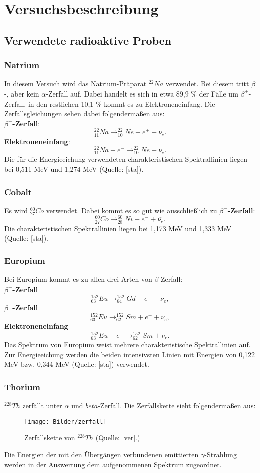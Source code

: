 \clearpage
\section{Versuchsbeschreibung}
\subsection{Verwendete radioaktive Proben}
\subsubsection{Natrium}
In diesem Versuch wird das Natrium-Präparat $^{22}Na$ verwendet. Bei diesem tritt $\beta$-, aber kein $\alpha$-Zerfall auf. Dabei handelt es sich in etwa 89,9 \% der Fälle um $\beta^{+}$-Zerfall, in den restlichen 10,1 \% kommt es zu Elektroneneinfang. Die Zerfallsgleichungen sehen dabei folgendermaßen aus:\\
\textbf{$\beta^{+}$-Zerfall}: \[^{22}_{11}Na\rightarrow ^{22}_{10}Ne+e^{+}+\nu_{e}.\]
\textbf{Elektroneneinfang}:
\[^{22}_{11}Na+e^{-}\rightarrow ^{22}_{10}Ne+\nu_{e}.\]
Die für die Energieeichung verwendeten charakteristischen Spektrallinien liegen bei 0,511 MeV und 1,274 MeV (Quelle: [sta]).
\subsubsection{Cobalt}
Es wird $^{60}_{27}Co$ verwendet. Dabei kommt es so gut wie ausschließlich zu \textbf{$\beta^{-}$-Zerfall}: \[^{60}_{27}Co\rightarrow ^{60}_{28}Ni+e^{-}+\overline{\nu_{e}}.\] Die charakteristischen Spektrallinien liegen bei 1,173 MeV und 1,333 MeV (Quelle: [sta]).
\subsubsection{Europium}
Bei Europium kommt es zu allen drei Arten von $\beta$-Zerfall:\\
\textbf{$\beta^{-}$-Zerfall} \[^{152}_{63}Eu\rightarrow ^{152}_{64}Gd+e^{-}+\overline{\nu_{e}},\]
\textbf{$\beta^{+}$-Zerfall}
\[^{152}_{63}Eu\rightarrow ^{152}_{62}Sm+e^{+}+\nu_{e},\]
\textbf{Elektroneneinfang} \[^{152}_{63}Eu+e^{-}\rightarrow ^{152}_{62}Sm+\nu_{e}.\]
Das Spektrum von Europium weist mehrere charakteristische Spektrallinien auf. Zur Energieeichung werden die beiden intensivsten Linien mit Energien von 0,122 MeV bzw. 0,344 MeV (Quelle: [sta]) verwendet.
\clearpage
\subsubsection{Thorium}
$^{228}Th$ zerfällt unter $\alpha$ und $beta$-Zerfall. Die Zerfallskette sieht folgendermaßen aus: 
\begin{figure}[h]
\begin{center}
\texttt{[image: Bilder/zerfall]}
\caption{Zerfallskette von $^{228}Th$ (Quelle: [ver].)}
\end{center}
\end{figure}
Die Energien der mit den Übergängen verbundenen emittierten $\gamma$-Strahlung werden in der Auswertung dem aufgenommenen Spektrum zugeordnet.


